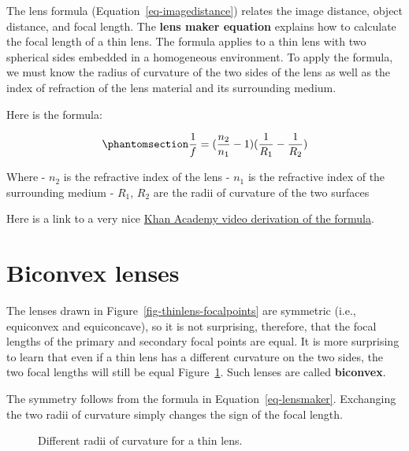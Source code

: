 \documentclass[
  letterpaper,
]{book}
\begin{document}
The lens formula (Equation~\ref{eq-imagedistance}) relates the image
distance, object distance, and focal length. The \textbf{lens maker
equation} explains how to calculate the focal length of a thin lens. The
formula applies to a thin lens with two spherical sides embedded in a
homogeneous environment. To apply the formula, we must know the radius
of curvature of the two sides of the lens as well as the index of
refraction of the lens material and its surrounding medium.

Here is the formula:

\begin{equation}\phantomsection\label{eq-lensmaker}{
\frac{1}{f} = (\frac{n_2}{n_1} - 1) ( \frac{1}{R_1} - \frac{1}{R_2}) 
}\end{equation}

Where - \(n_2\) is the refractive index of the lens - \(n_1\) is the
refractive index of the surrounding medium - \(R_1\), \(R_2\) are the
radii of curvature of the two surfaces

Here is a link to a very nice
\href{https://www.khanacademy.org/science/in-in-class-12th-physics-india/in-in-ray-optics-and-optical-instruments/in-in-refraction-in-thin-lenses/v/lens-makers-formula}{Khan
Academy video derivation of the formula}.

\section{Biconvex lenses}\label{sec-optics-biconvex}

The lenses drawn in Figure~\ref{fig-thinlens-focalpoints} are symmetric
(i.e., equiconvex and equiconcave), so it is not surprising, therefore,
that the focal lengths of the primary and secondary focal points are
equal. It is more surprising to learn that even if a thin lens has a
different curvature on the two sides, the two focal lengths will still
be equal Figure~\ref{fig-thinlens-asymmetric}. Such lenses are called
\textbf{biconvex}.

The symmetry follows from the formula in Equation~\ref{eq-lensmaker}.
Exchanging the two radii of curvature simply changes the sign of the
focal length.

\begin{figure}


\caption{\label{fig-thinlens-asymmetric}Different radii of curvature for
a thin lens.}

\end{figure}%
\end{document}
